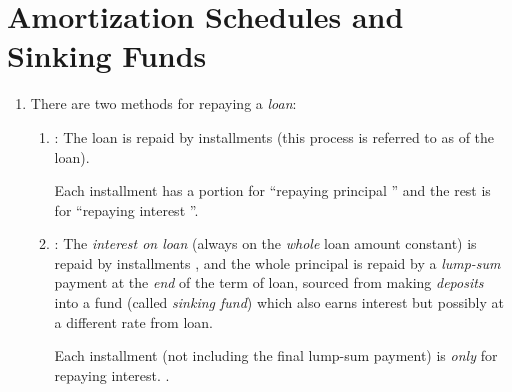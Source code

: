 \section{Amortization Schedules and Sinking Funds}
\label{sect:amort-sinking-funds}
\begin{enumerate}
\item There are two methods for repaying a \emph{loan}:
\begin{enumerate}
\item {}: The loan is repaid by installments
 (this process is referred to as  of the
loan).

 Each installment  has a portion for
``repaying principal '' and the rest is for ``repaying interest
''.
\item {}: The \emph{interest on loan} (always on the
\emph{whole} loan amount  constant)  is repaid
by installments , and the whole principal  is
repaid by a \emph{lump-sum} payment at the \emph{end} of the term of loan,
sourced from making \emph{deposits} into a fund (called \emph{sinking fund})
which also earns interest but possibly at a different rate from loan.

 Each installment (not including the final lump-sum
payment)  is \emph{only} for repaying interest.
.
\end{enumerate}
\end{enumerate}
